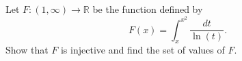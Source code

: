 Let $F:(1,\infty) \rightarrow \mathbb{R}$ be the function defined by
$$F(x)=\int_{x}^{x^{2}} \frac{dt}{\ln(t)}.$$Show that $F$ is injective and find the set of values of $F$.